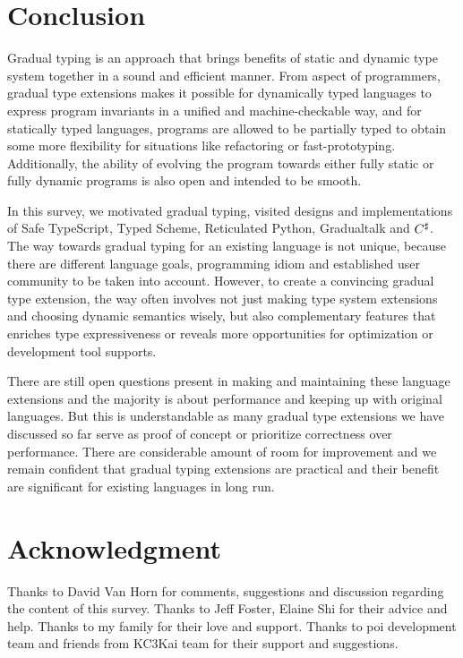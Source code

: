 \section{Conclusion}

Gradual typing is an approach that brings benefits of static and dynamic type system
together in a sound and efficient manner.
From aspect of programmers, gradual type extensions makes it possible
for dynamically typed languages
to express program invariants in a unified and machine-checkable way,
and for statically typed languages,
programs are allowed to be partially typed to obtain some more flexibility
for situations like refactoring or fast-prototyping.
Additionally, the ability of evolving the program towards
either fully static or fully dynamic programs is also open and intended to be smooth.

In this survey, we motivated gradual typing, visited designs and implementations of Safe TypeScript,
Typed Scheme, Reticulated Python, Gradualtalk and $C^\sharp$.
The way towards gradual typing for an existing language is not unique,
because there are different language goals, programming idiom and established user community
to be taken into account.
However, to create a convincing gradual type extension, the way often involves 
not just making type system extensions and choosing dynamic semantics wisely,
but also complementary features that enriches type expressiveness or
reveals more opportunities for optimization or development tool supports.

There are still open questions present in making and maintaining these language extensions and
the majority is about performance and keeping up with original languages.
But this is understandable as many gradual type extensions we have discussed so far
serve as proof of concept or prioritize correctness over performance.
There are considerable amount of room for improvement and we remain confident that
gradual typing extensions are practical and their benefit are significant for existing languages in long run.

\section*{Acknowledgment}

Thanks to David Van Horn for comments, suggestions and discussion regarding
the content of this survey.
Thanks to Jeff Foster, Elaine Shi for their advice and help.
Thanks to my family for their love and support.
Thanks to poi development team and friends from KC3Kai team for
their support and suggestions.

